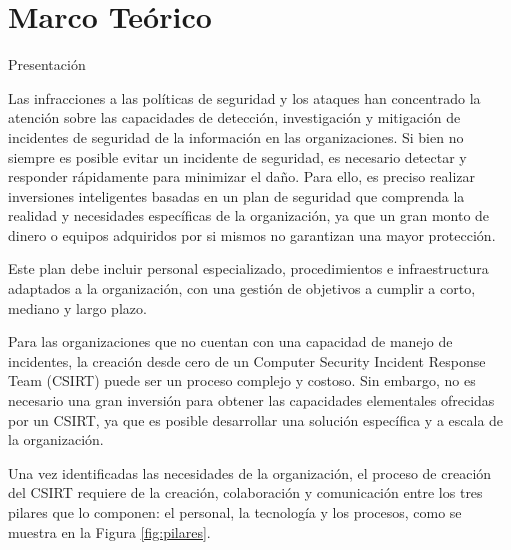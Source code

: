 \chapter{Marco Teórico}
    \begin{section}{Presentación}
    
        Las infracciones a las políticas de seguridad y los ataques han concentrado la atención sobre las capacidades de detección, investigación y mitigación de incidentes de seguridad de la información en  las organizaciones. Si bien no siempre es posible evitar un incidente de seguridad, es necesario detectar y responder rápidamente para minimizar el daño. Para ello, es preciso realizar inversiones inteligentes basadas en un plan de seguridad que comprenda la realidad y necesidades específicas de la organización, ya que un gran monto de dinero o equipos adquiridos por si mismos no garantizan una mayor protección. \par
        Este plan debe incluir personal especializado, procedimientos e infraestructura  adaptados a la organización, con una gestión de objetivos a cumplir a corto, mediano y largo plazo. \par
        Para las organizaciones que no cuentan con una capacidad de manejo de incidentes, la creación desde cero de un Computer Security Incident Response Team (CSIRT) puede ser un proceso complejo y costoso. Sin embargo, no es necesario una gran inversión para obtener las capacidades elementales ofrecidas por un CSIRT, ya que es posible desarrollar una solución específica y a escala de la organización. \par
        Una vez identificadas las necesidades de la organización, el proceso de creación del CSIRT requiere de la creación, colaboración y comunicación entre los tres pilares que lo componen: el personal, la tecnología y los procesos, como se muestra en la Figura \ref{fig:pilares}. \par
        

\end{section}
